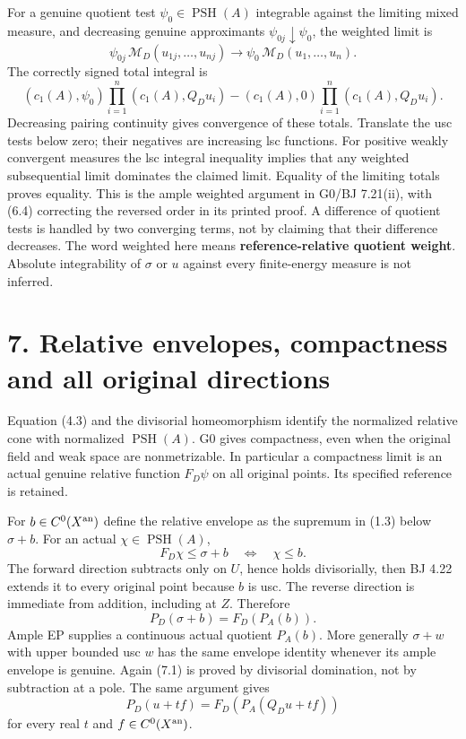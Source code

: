 \documentclass[
  10pt,
]{article}
\begin{document}
For a genuine quotient test \(\psi_0\in\operatorname{PSH}(A)\)
integrable against the limiting mixed measure, and decreasing genuine
approximants \(\psi_{0j}\downarrow\psi_0\), the weighted limit is \[
 \psi_{0j}\,\mathcal M_D(u_{1j},\ldots,u_{nj})
                     \longrightarrow \psi_0\,\mathcal M_D(u_1,\ldots,u_n). \tag{6.3}
\] The correctly signed total integral is \[
 (c_1(A),\psi_0)\prod_{i=1}^n(c_1(A),Q_Du_i)
          -(c_1(A),0)\prod_{i=1}^n(c_1(A),Q_Du_i).             \tag{6.4}
\] Decreasing pairing continuity gives convergence of these totals.
Translate the usc tests below zero; their negatives are increasing lsc
functions. For positive weakly convergent measures the lsc integral
inequality implies that any weighted subsequential limit dominates the
claimed limit. Equality of the limiting totals proves equality. This is
the ample weighted argument in G0/BJ 7.21(ii), with (6.4) correcting the
reversed order in its printed proof. A difference of quotient tests is
handled by two converging terms, not by claiming that their difference
decreases. The word weighted here means \textbf{reference-relative
quotient weight}. Absolute integrability of \(\sigma\) or \(u\) against
every finite-energy measure is not inferred.

\section{7. Relative envelopes, compactness and all original
directions}\label{relative-envelopes-compactness-and-all-original-directions}

Equation (4.3) and the divisorial homeomorphism identify the normalized
relative cone with normalized \(\operatorname{PSH}(A)\). G0 gives
compactness, even when the original field and weak space are
nonmetrizable. In particular a compactness limit is an actual genuine
relative function \(F_D\psi\) on all original points. Its specified
reference is retained.

For \(b\in C^0(X^{\rm an})\) define the relative envelope as the
supremum in (1.3) below \(\sigma+b\). For an actual
\(\chi\in\operatorname{PSH}(A)\), \[
 F_D\chi\leq\sigma+b
     \quad\Longleftrightarrow\quad \chi\leq b.                \tag{7.1}
\] The forward direction subtracts only on \(U\), hence holds
divisorially, then BJ 4.22 extends it to every original point because
\(b\) is usc. The reverse direction is immediate from addition,
including at \(Z\). Therefore \[
                    P_D(\sigma+b)=F_D(P_A(b)).                \tag{7.2}
\] Ample EP supplies a continuous actual quotient \(P_A(b)\). More
generally \(\sigma+w\) with upper bounded usc \(w\) has the same
envelope identity whenever its ample envelope is genuine. Again (7.1) is
proved by divisorial domination, not by subtraction at a pole. The same
argument gives \[
                 P_D(u+tf)=F_D(P_A(Q_Du+tf))                  \tag{7.3}
\] for every real \(t\) and \(f\in C^0(X^{\rm an})\).
\end{document}
